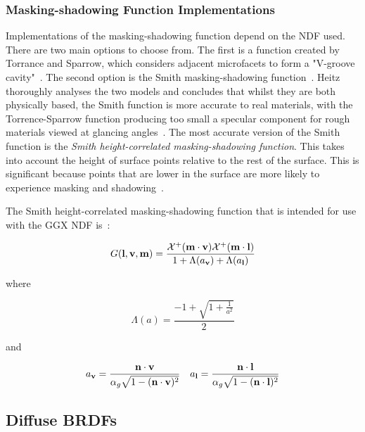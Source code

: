 \subsubsection{Masking-shadowing Function Implementations}

Implementations of the masking-shadowing function depend on the NDF used. There are two main options to choose from. The first is a function created by Torrance and Sparrow, which considers adjacent microfacets to form a "V-groove cavity"~\cite{TorranceSparrowVCavity}. The second option is the Smith masking-shadowing function~\cite{SmithMaskingShadowingFunction}. Heitz thoroughly analyses the two models and concludes that whilst they are both physically based, the Smith function is more accurate to real materials, with the Torrence-Sparrow function producing too small a specular component for rough materials viewed at glancing angles~\cite{HeitzMicrofacetTheory}. The most accurate version of the Smith function is the \textit{Smith height-correlated masking-shadowing function}. This takes into account the height of surface points relative to the rest of the surface. This is significant because points that are lower in the surface are more likely to experience masking and shadowing~\cite{RTR4}.

The Smith height-correlated masking-shadowing function that is intended for use with the GGX NDF is~\cite{RTR4}:

\begin{equation} \label{eq:SmithGGXFunction}
	G(\mathbf{l}, \mathbf{v}, \mathbf{m}) = \frac{\mathcal{X}^+(\mathbf{m}\cdot\mathbf{v})\mathcal{X}^+(\mathbf{m}\cdot\mathbf{l})}{1 + \Lambda(a_{\mathbf{v}}) + \Lambda(a_{\mathbf{l}})}
\end{equation}

where

\begin{equation}
	\Lambda(a) = \frac{-1 + \sqrt{1 + \frac{1}{a^2}}}{2}
\end{equation}

and

\begin{gather*}
	a_{\mathbf{v}} = \frac{\mathbf{n}\cdot\mathbf{v}}{\alpha_g\sqrt{1 - (\mathbf{n}\cdot\mathbf{v})^2}}
	\quad
	a_{\mathbf{l}} = \frac{\mathbf{n}\cdot\mathbf{l}}{\alpha_g\sqrt{1 - (\mathbf{n}\cdot\mathbf{l})^2}}
\end{gather*}

\subsection{Diffuse BRDFs} \label{DiffuseBRDFs}

